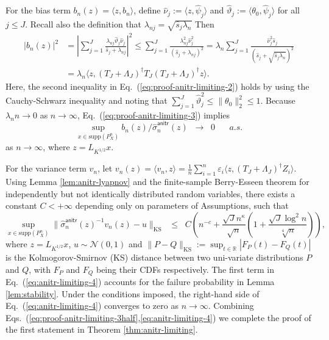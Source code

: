 \documentclass[11pt,a4paper]{article}
\newcommand{\ks}{\mathrm{KS}}
\renewcommand{\hat}{\widehat}
\theoremstyle{definition}
\theoremstyle{plain}
\theoremstyle{remark}
\newcommand{\supp}{\mathrm{supp}}
\newcommand{\anitr}{\mathsf{anitr}}
\begin{document}
For the bias term $b_n(z)=\langle z,b_n\rangle$, define $\hat\nu_j := \langle z,\hat\psi_j\rangle$ and $\hat\vartheta_j := \langle \theta_0,\hat\psi_j\rangle$ for all $j\leq J$. 
Recall also the definition that $\lambda_{nj} = \sqrt{\hat s_j\lambda_n}$ Then
\begin{align}
\big|b_n(z)\big|^2 &= \left|\sum_{j=1}^J\frac{\lambda_{nj}\hat\vartheta_j\hat\nu_j}{\hat s_j+\lambda_{nj}}\right|^2 \leq \sum_{j=1}^J\frac{\lambda_{nj}^2\hat\nu_j^2}{(\hat s_j+\lambda_{nj})^2}
=\lambda_n\sum_{j=1}^J\frac{\hat\nu_j^2\hat s_j}{(\hat s_j+\sqrt{\hat s_j\lambda_n})^2}\label{eq:proof-anitr-limiting-2}\\
&= \lambda_n\langle z, (T_J+\Lambda_J)^\dagger T_J(T_J+\Lambda_J)^\dagger z\rangle.\label{eq:proof-anitr-limiting-3}
\end{align}
Here, the second inequality in Eq.~(\ref{eq:proof-anitr-limiting-2}) holds by using the Cauchy-Schwarz inequality and noting that $\sum_{j=1}^J\hat\vartheta_j^2\leq \|\theta_0\|_2^2\leq 1$.
Because $\lambda_n n\to0$ as $n\to\infty$, Eq.~(\ref{eq:proof-anitr-limiting-3}) implies
\begin{equation}
\sup_{x\in \supp(P_X^n)}b_n(z)/\hat\sigma_n^\anitr(z)\;\;\to\;\;0\;\;\;\;\;\;a.s.
\label{eq:proof-anitr-limiting-3half}
\end{equation}
as $n\to\infty$, where $z=L_{K^{1/2}}x$.

For the variance term $v_n$, let $v_n(z)= \langle v_n,z\rangle = \frac{1}{n}\sum_{i=1}^n\varepsilon_i \langle z, (T_J+\Lambda_J)^\dagger Z_i\rangle$.
Using Lemma \ref{lem:anitr-lyapnov} and the finite-sample Berry-Esseen theorem for independently but not identically distributed random variables, there exists a constant $C<+\infty$
depending only on parameters of Assumptions, such that
\begin{equation}
\sup_{x\in\supp(P_X^n)} \|\hat\sigma_n^\anitr(z)^{-1}v_n(z) - u\|_{\ks} \;\;\leq\;\; C\left(n^{-c} + \frac{\sqrt{J}n^{\kappa}}{\sqrt{n}} \left(1+\frac{\sqrt{J}\log^2 n}{\sqrt[4]{n}}\right)\right),
\label{eq:anitr-limiting-4}
\end{equation}
where $z=L_{K^{1/2}}x$, $u\sim\mathcal N(0,1)$ and $\|P-Q\|_\ks := \sup_{t\in\mathbb R}|F_P(t)-F_Q(t)|$ is the Kolmogorov-Smirnov (KS) distance between two uni-variate distributions $P$ and $Q$,
with $F_P$ and $F_Q$ being their CDFs respectively.
The first term in Eq.~(\ref{eq:anitr-limiting-4}) accounts for the failure probability in Lemma \ref{lem:stability}.
Under the conditions imposed, the right-hand side of Eq.~(\ref{eq:anitr-limiting-4}) converges to zero as $n\to\infty$.
Combining Eqs.~(\ref{eq:proof-anitr-limiting-3half},\ref{eq:anitr-limiting-4}) we complete the proof of the first statement in Theorem \ref{thm:anitr-limiting}.
\end{document}
